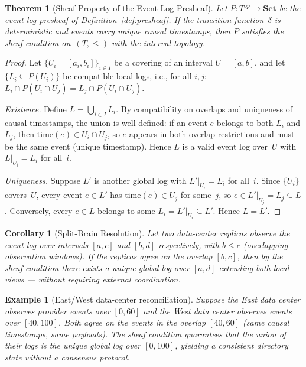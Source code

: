 \documentclass[11pt,a4paper]{article}
\newtheorem{theorem}[definition]{Theorem}
\newtheorem{corollary}[definition]{Corollary}
\newtheorem{example}[definition]{Example}
\begin{document}
\begin{theorem}[Sheaf Property of the Event-Log Presheaf]
\label{thm:sheaf}
Let $P:T^{op}\to\mathbf{Set}$ be the event-log presheaf of
Definition~\ref{def:presheaf}. If the transition function~$\delta$ is
deterministic and events carry unique causal timestamps, then $P$
satisfies the sheaf condition on~$(T,\le)$ with the interval topology.
\end{theorem}

\begin{proof}
Let $\{U_i = [a_i, b_i]\}_{i\in I}$ be a covering of an interval
$U = [a, b]$, and let $\{L_i \subseteq P(U_i)\}$ be compatible local
logs, i.e., for all $i,j$: $L_i \cap P(U_i \cap U_j) = L_j \cap P(U_i
\cap U_j)$.

\emph{Existence.} Define $L = \bigcup_{i\in I} L_i$. By compatibility
on overlaps and uniqueness of causal timestamps, the union is
well-defined: if an event $e$ belongs to both $L_i$ and $L_j$, then
$\mathrm{time}(e) \in U_i \cap U_j$, so $e$ appears in both overlap
restrictions and must be the same event (unique timestamp). Hence $L$ is
a valid event log over~$U$ with $L|_{U_i} = L_i$ for all~$i$.

\emph{Uniqueness.} Suppose $L'$ is another global log with
$L'|_{U_i} = L_i$ for all~$i$. Since $\{U_i\}$ covers~$U$, every event
$e \in L'$ has $\mathrm{time}(e) \in U_j$ for some~$j$, so $e \in
L'|_{U_j} = L_j \subseteq L$. Conversely, every $e \in L$ belongs to
some $L_i = L'|_{U_i} \subseteq L'$. Hence $L = L'$.
\end{proof}

\begin{corollary}[Split-Brain Resolution]
\label{cor:split-brain}
Let two data-center replicas observe the event log over intervals
$[a,c]$ and $[b,d]$ respectively, with $b \le c$ (overlapping
observation windows). If the replicas agree on the overlap
$[b,c]$, then by the sheaf condition there exists a unique global
log over $[a,d]$ extending both local views --- without requiring
external coordination.
\end{corollary}

\begin{example}[East/West data-center reconciliation]
\label{ex:split-brain}
Suppose the East data center observes provider events over $[0,60]$
and the West data center observes events over $[40,100]$. Both agree
on the events in the overlap $[40,60]$ (same causal timestamps, same
payloads). The sheaf condition guarantees that the union of their logs
is the unique global log over $[0,100]$, yielding a consistent
directory state without a consensus protocol.
\end{example}
\end{document}
